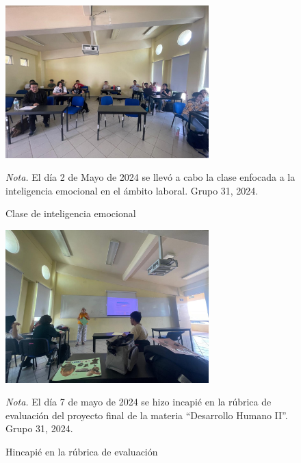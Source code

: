 \begin{figure}
    \caption{Clase de inteligencia emocional\label{fig:No.3}}
    \includegraphics[width=0.7\textwidth]{./assets/img/imagen3DH.jpeg}

	\textit{Nota.} El d\'ia 2 de Mayo de 2024 se llev\'o a cabo la clase enfocada a la inteligencia emocional en el ámbito laboral. Grupo 31, 2024.
\end{figure}

\begin{figure}
    \caption{Hincapi\'e en la r\'ubrica de evaluaci\'on\label{fig:No.4}}

    \includegraphics[width=0.7\textwidth]{./assets/img/imagen4DH.jpeg}

	\textit{Nota.} El día 7 de mayo de 2024 se hizo incapi\'e en la r\'ubrica de evaluaci\'on del proyecto final de la materia ``Desarrollo Humano II''. Grupo 31, 2024.
\end{figure}

